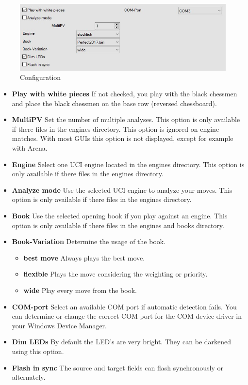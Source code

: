 \documentclass[11pt,a4paper]{article}
\begin{document}
\begin{figure}[H]
	\centering
	\includegraphics[scale=0.7]{configuration.jpg}
	\caption{Configuration}
	\label{fig:configration}
\end{figure}
\begin{itemize}

	\item \textbf{Play with white pieces} If not checked, you play with the black chessmen and place the black chessmen on the base row (reversed chessboard).

	\item \textbf{MultiPV} Set the number of multiple analyses. This option is only available if there files in the engines directory. This option is ignored on engine matches. With most GUIs this option is not displayed, except for example with Arena.
	
	\item \textbf{Engine} Select one UCI engine located in the engines directory. This option is only available if there files in the engines directory.

    \item \textbf{Analyze mode} Use the selected UCI engine to analyze your moves. This option is only available if there files in the engines directory.
    \item \textbf{Book} Use the selected opening book if you play against an engine. This option is only available if there files in the engines and books directory.
   \item \textbf{Book-Variation} Determine the usage of the book.
   \begin{itemize}
   	  \item \textbf{best move} Always plays the best move.
   	  \item \textbf{flexible} Plays the move considering the weighting or priority.
   	  \item \textbf{wide} Play every move from the book.
   \end{itemize}
    \item \textbf{COM-port} Select an available COM port if automatic detection fails. You can determine or change the correct COM port for the COM device driver in your Windows Device Manager.
    \item \textbf{Dim LEDs} By default the LED's are very bright. They can be darkened using this option.
    \item \textbf{Flash in sync} The source and target fields can flash synchronously or alternately.

\end{itemize}
\end{document}
